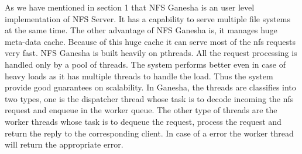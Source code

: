    As we have mentioned in section 1 that NFS Ganesha is an user level implementation of NFS Server. It has a capability to serve multiple file systems at the same time. The other advantage of NFS Ganesha is, it manages huge meta-data cache. Because of this huge cache it can serve most of the nfs requests very fast. NFS Ganesha is built heavily on pthreads.
All the request processing is handled only by a pool of threads. The system performs better even in case of heavy loads as it has multiple threads to handle the load. Thus the system provide good guarantees on scalability. In Ganesha, the threads are classifies into two types, one is the dispatcher thread whose task is to decode incoming the nfs request and enqueue in the worker queue. The other type of threads are the worker threads whose task is to dequeue the request, process the request and return the reply to the corresponding client. In case of a error the worker thread will return the appropriate error.




